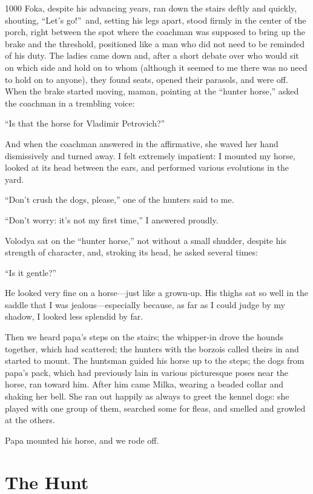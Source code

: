 \begin{tolerant}{1000}
Foka, despite his advancing years, ran down the stairs deftly and quickly, shouting, ``Let's go!''~and, setting his legs apart, stood firmly in the center of the porch, right between the spot where the coachman was supposed to bring up the brake and the threshold, positioned like a man who did not need to be reminded of his duty. The ladies came down and, after a short debate over who would sit on which side and hold on to whom (although it seemed to me there was no need to hold on to anyone), they found seats, opened their parasols, and were off. When the brake started moving, maman, pointing at the ``hunter horse,'' asked the coachman in a trembling voice:
\end{tolerant}

``Is that the horse for Vladimir Petrovich?'' %

And when the coachman answered in the affirmative, she waved her hand dismissively and turned away. I felt extremely impatient: I mounted my horse, looked at its head between the ears, and performed various evolutions in the yard.

``Don't crush the dogs, please,'' one of the hunters said to me. %

``Don't worry: it's not my first time,'' I answered proudly. %

Volodya sat on the ``hunter horse,'' not without a small shudder, despite his strength of character, and, stroking its head, he asked several times:

``Is it gentle?'' %

He looked very fine on a horse---just like a grown-up. His thighs sat so well in the saddle that I was jealous---especially because, as far as I could judge by my shadow, I looked less splendid by far.

Then we heard papa's steps on the stairs; the whipper-in drove the hounds together, which had scattered; the hunters with the borzois called theirs in and started to mount. The huntsman guided his horse up to the steps; the dogs from papa's pack, which had previously lain in various picturesque poses near the horse, ran toward him. After him came Milka, wearing a beaded collar and shaking her bell. She ran out happily as always to greet the kennel dogs: she played with one group of them, searched some for fleas, and smelled and growled at the others.

Papa mounted his horse, and we rode off.

\chapter{The Hunt} %

